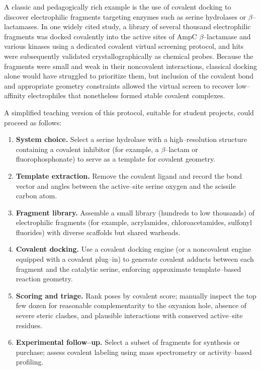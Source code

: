 \documentclass[12pt]{article}
\begin{document}
A classic and pedagogically rich example is the use of covalent docking to discover electrophilic fragments targeting enzymes such as serine hydrolases or \(\beta\)–lactamases.  
In one widely cited study, a library of several thousand electrophilic fragments was docked covalently into the active sites of AmpC \(\beta\)–lactamase and various kinases using a dedicated covalent virtual screening protocol, and hits were subsequently validated crystallographically as chemical probes.
Because the fragments were small and weak in their noncovalent interactions, classical docking alone would have struggled to prioritize them, but inclusion of the covalent bond and appropriate geometry constraints allowed the virtual screen to recover low–affinity electrophiles that nonetheless formed stable covalent complexes.\cite{CH14_CovalentLargeLibraries2014}

A simplified teaching version of this protocol, suitable for student projects, could proceed as follows:

\begin{enumerate}
  \item \textbf{System choice.} Select a serine hydrolase with a high–resolution structure containing a covalent inhibitor (for example, a \(\beta\)–lactam or fluorophosphonate) to serve as a template for covalent geometry.  
  \item \textbf{Template extraction.} Remove the covalent ligand and record the bond vector and angles between the active–site serine oxygen and the scissile carbon atom.  
  \item \textbf{Fragment library.} Assemble a small library (hundreds to low thousands) of electrophilic fragments (for example, acrylamides, chloroacetamides, sulfonyl fluorides) with diverse scaffolds but shared warheads.  
  \item \textbf{Covalent docking.} Use a covalent docking engine (or a noncovalent engine equipped with a covalent plug–in) to generate covalent adducts between each fragment and the catalytic serine, enforcing approximate template–based reaction geometry.  
  \item \textbf{Scoring and triage.} Rank poses by covalent score; manually inspect the top few dozen for reasonable complementarity to the oxyanion hole, absence of severe steric clashes, and plausible interactions with conserved active–site residues.  
  \item \textbf{Experimental follow–up.} Select a subset of fragments for synthesis or purchase; assess covalent labeling using mass spectrometry or activity–based profiling.
\end{enumerate}
\end{document}
